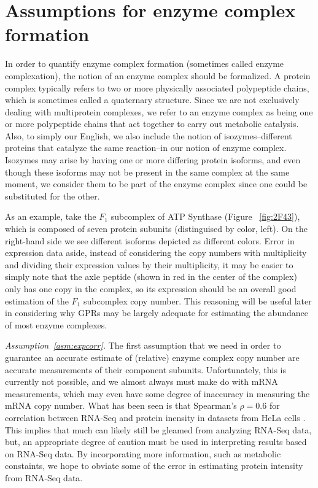 \section{Assumptions for enzyme complex formation}
\label{sec:complexation}

In order to quantify enzyme complex formation (sometimes called enzyme
complexation), the notion of an enzyme complex should be formalized.
A protein complex typically refers to two or more physically
associated polypeptide chains, which is sometimes called a quaternary
structure. Since we are not exclusively dealing with multiprotein
complexes, we refer to an enzyme complex as being one or more
polypeptide chains that act together to carry out metabolic
catalysis. Also, to simply our English, we also include the notion of
isozymes--different proteins that catalyze the same reaction--in our
notion of enzyme complex. Isozymes may arise by having one or more
differing protein isoforms, and even though these isoforms may not be
present in the same complex at the same moment, we consider them to be
part of the enzyme complex since one could be substituted for the
other.

As an example, take the $F_1$ subcomplex of ATP Synthase (Figure
~\ref{fig:2F43}), which is composed of seven protein subunits
(distinguised by color, left). On the right-hand side we see different
isoforms depicted as different colors.  Error in expression data
aside, instead of considering the copy numbers with multiplicity and
dividing their expression values by their multiplicity, it may be
easier to simply note that the axle peptide (shown in red in the
center of the complex) only has one copy in the complex, so its
expression should be an overall good estimation of the $F_1$
subcomplex copy number. This reasoning will be useful later in
considering why GPRs may be largely adequate for estimating the
abundance of most enzyme complexes.

\emph{Assumption~\ref{asm:expcorr}.}  The first assumption that we
need in order to guarantee an accurate estimate of (relative) enzyme
complex copy number are accurate measurements of their component
subunits. Unfortunately, this is currently not possible, and we almost
always must make do with mRNA measurements, which may even have some
degree of inaccuracy in measuring the mRNA copy number. What has been
seen is that Spearman's $\rho = 0.6$ for correlation between RNA-Seq
and protein inensity in datasets from HeLa cells
\citep{Nagaraj2011}. This implies that much can likely still be
gleamed from analyzing RNA-Seq data, but, an appropriate degree of
caution must be used in interpreting results based on RNA-Seq data. By
incorporating more information, such as metabolic constaints, we hope
to obviate some of the error in estimating protein intensity from
RNA-Seq data.


